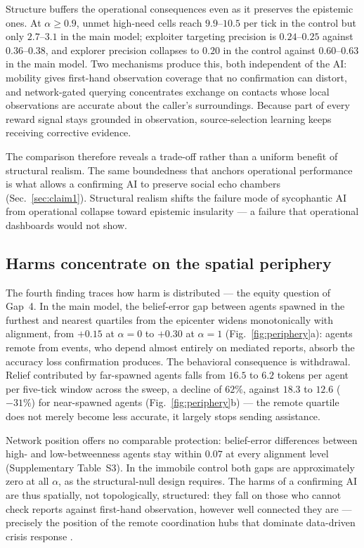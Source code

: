 \documentclass[pdflatex,sn-nature]{sn-jnl}
\begin{document}
Structure buffers the operational consequences even as it preserves the epistemic ones. At $\alpha \geq 0.9$, unmet high-need cells reach $9.9$--$10.5$ per tick in the control but only $2.7$--$3.1$ in the main model; exploiter targeting precision is $0.24$--$0.25$ against $0.36$--$0.38$, and explorer precision collapses to $0.20$ in the control against $0.60$--$0.63$ in the main model. Two mechanisms produce this, both independent of the AI: mobility gives first-hand observation coverage that no confirmation can distort, and network-gated querying concentrates exchange on contacts whose local observations are accurate about the caller's surroundings. Because part of every reward signal stays grounded in observation, source-selection learning keeps receiving corrective evidence.

The comparison therefore reveals a trade-off rather than a uniform benefit of structural realism. The same boundedness that anchors operational performance is what allows a confirming AI to preserve social echo chambers (Sec.~\ref{sec:claim1}). Structural realism shifts the failure mode of sycophantic AI from operational collapse toward epistemic insularity --- a failure that operational dashboards would not show.

\subsection{Harms concentrate on the spatial periphery}\label{sec:claim4}

The fourth finding traces how harm is distributed --- the equity question of Gap~4. In the main model, the belief-error gap between agents spawned in the furthest and nearest quartiles from the epicenter widens monotonically with alignment, from $+0.15$ at $\alpha = 0$ to $+0.30$ at $\alpha = 1$ (Fig.~\ref{fig:periphery}a): agents remote from events, who depend almost entirely on mediated reports, absorb the accuracy loss confirmation produces. The behavioral consequence is withdrawal. Relief contributed by far-spawned agents falls from $16.5$ to $6.2$ tokens per agent per five-tick window across the sweep, a decline of $62\%$, against $18.3$ to $12.6$ ($-31\%$) for near-spawned agents (Fig.~\ref{fig:periphery}b) --- the remote quartile does not merely become less accurate, it largely stops sending assistance.

Network position offers no comparable protection: belief-error differences between high- and low-betweenness agents stay within $0.07$ at every alignment level (Supplementary Table~S3). In the immobile control both gaps are approximately zero at all $\alpha$, as the structural-null design requires. The harms of a confirming AI are thus spatially, not topologically, structured: they fall on those who cannot check reports against first-hand observation, however well connected they are --- precisely the position of the remote coordination hubs that dominate data-driven crisis response \citep{comes2020coordination,coleman2024weaving}.
\end{document}
